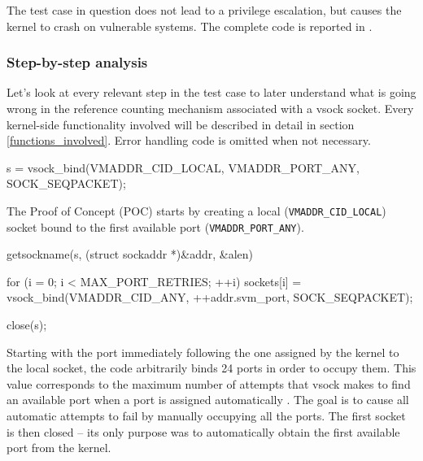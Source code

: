 \noindent The test case in question does not lead to a privilege escalation, but causes the kernel to crash on vulnerable systems. The complete code is reported in .

\subsubsection{Step-by-step analysis}
Let's look at every relevant step in the test case to later understand what is going wrong in the reference counting mechanism associated with a vsock socket. Every kernel-side functionality involved will be described in detail in section \ref{functions_involved}. Error handling code is omitted when not necessary.

\begin{clncode}[firstnumber=14]
    s = vsock_bind(VMADDR_CID_LOCAL, VMADDR_PORT_ANY, SOCK_SEQPACKET);
\end{clncode}

\noindent The Proof of Concept (POC) starts by creating a local (\lstinline{VMADDR_CID_LOCAL}) socket bound to the first available port (\lstinline{VMADDR_PORT_ANY}).

\begin{clncode}[firstnumber=26]
    getsockname(s, (struct sockaddr *)&addr, &alen)

    for (i = 0; i < MAX_PORT_RETRIES; ++i) {
        sockets[i] =
            vsock_bind(VMADDR_CID_ANY, ++addr.svm_port, SOCK_SEQPACKET);
    }
    
    close(s);
\end{clncode}

\noindent Starting with the port immediately following the one assigned by the kernel to the local socket, the code arbitrarily binds 24 ports in order to occupy them. This value corresponds to the maximum number of attempts that vsock makes to find an available port when a port is assigned automatically \cite{bib:af-vsock-max-retries}. The goal is to cause all automatic attempts to fail by manually occupying all the ports.
The first socket is then closed -- its only purpose was to automatically obtain the first available port from the kernel.


